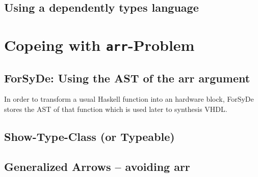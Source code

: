 \documentclass[9pt,final,a4paper,leqno]{article}
\newcommand{\hs}[1]{\mbox{\lstinline[basicstyle=\color{textgray}]!#1!}}
\begin{document}
\subsection{Using a dependently types language}

\section{Copeing with \hs{arr}-Problem}

\subsection{ForSyDe: Using the AST of the arr argument}

In order to transform a usual Haskell function into an hardware block, ForSyDe stores the AST of that function which is
used later to synthesis VHDL.  \subsection{Show-Type-Class (or Typeable)}

\subsection{Generalized Arrows -- avoiding arr}




\end{document}
